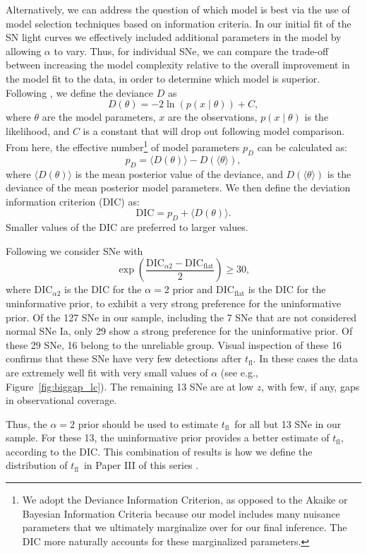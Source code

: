 \documentclass[twocolumn]{aastex63}
\newcommand{\tfl}{$t_\mathrm{fl}$}
\begin{document}
Alternatively, we can address the question of which model is best via the use
of model selection techniques based on information criteria. In our initial
fit of the SN light curves we effectively included additional parameters in
the model by allowing $\alpha$ to vary. Thus, for individual SNe, we can
compare the trade-off between increasing the model complexity relative to the
overall improvement in the model fit to the data, in order to determine which
model is superior. Following \citet{Spiegelhalter02}, we define the deviance
$D$ as
%
$$D(\theta) = -2 \ln (p(x\mid \theta)) + C,$$
%
where $\theta$ are the model parameters, $x$ are the observations, $p(x\mid
\theta)$ is the likelihood, and $C$ is a constant that will drop out following
model comparison. From here, the effective number\footnote{We adopt the
Deviance Information Criterion, as opposed to the Akaike or Bayesian
Information Criteria because our model includes many nuisance parameters that
we ultimately marginalize over for our final inference. The DIC more naturally
accounts for these marginalized parameters.} of model parameters $p_D$ can be
calculated as:
%
$$p_D = \langle D(\theta) \rangle - D(\langle \theta \rangle),$$
%
where $\langle D(\theta) \rangle$ is the mean posterior value of the deviance,
and $D(\langle \theta \rangle)$ is the deviance of the mean posterior model
parameters. We then define the deviation information criterion (DIC) as:
%
$$\mathrm{DIC} = p_D + \langle D(\theta) \rangle.$$
% 
Smaller values of  the DIC are  preferred to larger values.

Following \citet{Jeffreys61} we consider SNe with
%
$$\exp\left(\frac{\mathrm{DIC}_{\alpha2} - \mathrm{DIC}_\mathrm{flat}}{2}\right) \ge 30,$$
%
where $\mathrm{DIC}_{\alpha2}$ is the DIC for the $\alpha = 2$ prior and
$\mathrm{DIC}_\mathrm{flat}$ is the DIC for the uninformative prior, to
exhibit a very strong preference for the uninformative prior. Of the 127 SNe
in our sample, including the 7 SNe that are not considered normal SNe Ia, only
29 show a strong preference for the uninformative prior. Of these 29 SNe, 16
belong to the unreliable group. Visual inspection of these 16 confirms that
these SNe have very few detections after \tfl. In these cases the data are
extremely well fit with very small values of $\alpha$ (see e.g.,
Figure~\ref{fig:biggap_lc}). The remaining 13 SNe are at low $z$, with few, if
any, gaps in observational coverage.

Thus, the $\alpha = 2$ prior should be used to estimate \tfl\ for all but 13
SNe in our sample. For these 13, the uninformative prior provides a better
estimate of \tfl, according to the DIC. This combination of results is how we
define the distribution of \tfl\ in Paper III of this series \citep{Bulla20}.
\end{document}
